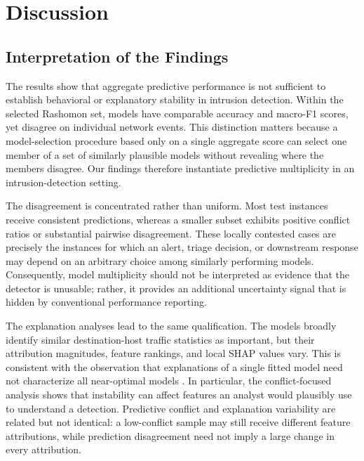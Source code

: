 \section{Discussion}

\subsection{Interpretation of the Findings}

The results show that aggregate predictive performance is not sufficient to establish behavioral or explanatory stability in intrusion detection. Within the selected Rashomon set, models have comparable accuracy and macro-\gls{F1} scores, yet disagree on individual network events. This distinction matters because a model-selection procedure based only on a single aggregate score can select one member of a set of similarly plausible models without revealing where the members disagree. Our findings therefore instantiate predictive multiplicity \cite{marx2020predictive,hsu2022rashomon} in an intrusion-detection setting.

The disagreement is concentrated rather than uniform. Most test instances receive consistent predictions, whereas a smaller subset exhibits positive conflict ratios or substantial pairwise disagreement. These locally contested cases are precisely the instances for which an alert, triage decision, or downstream response may depend on an arbitrary choice among similarly performing models. Consequently, model multiplicity should not be interpreted as evidence that the detector is unusable; rather, it provides an additional uncertainty signal that is hidden by conventional performance reporting.

The explanation analyses lead to the same qualification. The models broadly identify similar destination-host traffic statistics as important, but their attribution magnitudes, feature rankings, and local \gls{SHAP} values vary. This is consistent with the observation that explanations of a single fitted model need not characterize all near-optimal models \cite{brunet2022implications,laberge2023partial}. In particular, the conflict-focused analysis shows that instability can affect features an analyst would plausibly use to understand a detection. Predictive conflict and explanation variability are related but not identical: a low-conflict sample may still receive different feature attributions, while prediction disagreement need not imply a large change in every attribution.

